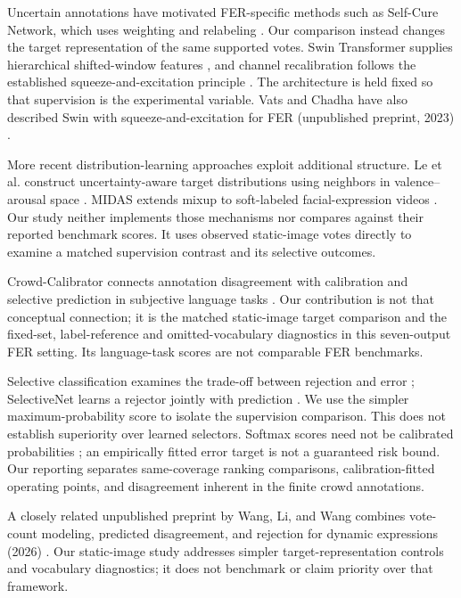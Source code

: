 \documentclass[pdflatex,sn-mathphys-num]{sn-jnl}
\begin{document}
Uncertain annotations have motivated FER-specific methods such as Self-Cure Network, which uses weighting and relabeling \cite{wang2020scn}. Our comparison instead changes the target representation of the same supported votes. Swin Transformer supplies hierarchical shifted-window features \cite{liu2021swin}, and channel recalibration follows the established squeeze-and-excitation principle \cite{hu2018senet}. The architecture is held fixed so that supervision is the experimental variable.
Vats and Chadha have also described Swin with squeeze-and-excitation for FER (unpublished preprint, 2023) \cite{vats2023swin}.

More recent distribution-learning approaches exploit additional structure. Le et al. construct uncertainty-aware target distributions using neighbors in valence--arousal space \cite{le2023uncertainty}. MIDAS extends mixup to soft-labeled facial-expression videos \cite{kawamura2024midas}. Our study neither implements those mechanisms nor compares against their reported benchmark scores. It uses observed static-image votes directly to examine a matched supervision contrast and its selective outcomes.

Crowd-Calibrator connects annotation disagreement with calibration and selective prediction in subjective language tasks \cite{khurana2024crowd}. Our contribution is not that conceptual connection; it is the matched static-image target comparison and the fixed-set, label-reference and omitted-vocabulary diagnostics in this seven-output FER setting. Its language-task scores are not comparable FER benchmarks.

Selective classification examines the trade-off between rejection and error \cite{geifman2017selective}; SelectiveNet learns a rejector jointly with prediction \cite{geifman2019selectivenet}. We use the simpler maximum-probability score to isolate the supervision comparison. This does not establish superiority over learned selectors. Softmax scores need not be calibrated probabilities \cite{guo2017calibration}; an empirically fitted error target is not a guaranteed risk bound. Our reporting separates same-coverage ranking comparisons, calibration-fitted operating points, and disagreement inherent in the finite crowd annotations.

A closely related unpublished preprint by Wang, Li, and Wang combines vote-count modeling, predicted disagreement, and rejection for dynamic expressions (2026) \cite{wang2026disagreement}. Our static-image study addresses simpler target-representation controls and vocabulary diagnostics; it does not benchmark or claim priority over that framework.
\end{document}
